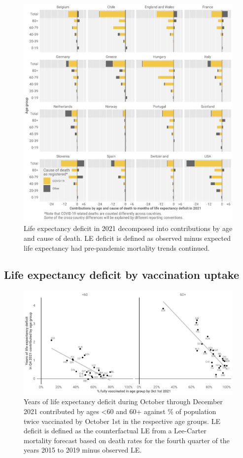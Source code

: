 \documentclass[12pt]{article}
\begin{document}
\begin{figure}[ht!]
    \centering
    \includegraphics{figure-4.pdf}
    \caption{Life expectancy deficit in 2021 decomposed into contributions by age and cause of death. LE deficit is defined as observed minus expected life expectancy had pre-pandemic mortality trends continued.}
    \label{fig:figure-4}
\end{figure}

\subsection*{Life expectancy deficit by vaccination uptake}

\begin{figure}[ht!]
    \centering
    \includegraphics{figure-5.pdf}
    \caption{Years of life expectancy deficit during October through December 2021 contributed by ages <60 and 60+ against \% of population twice vaccinated by October 1st in the respective age groups. LE deficit is defined as the counterfactual LE from a Lee-Carter mortality forecast based on death rates for the fourth quarter of the years 2015 to 2019 minus observed LE.}
    \label{fig:figure-5}
\end{figure}
\end{document}
